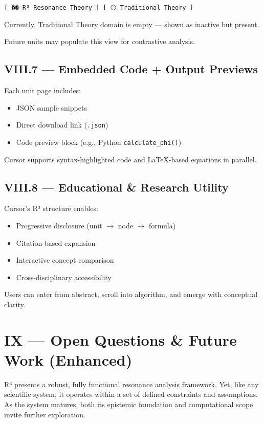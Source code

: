 \begin{verbatim}
[ �� R³ Resonance Theory ] [ ⚪ Traditional Theory ]
\end{verbatim}

Currently, Traditional Theory domain is empty — shown as inactive but present.

Future units may populate this view for contrastive analysis.

\subsection*{VIII.7 — Embedded Code + Output Previews}

Each unit page includes:

\begin{itemize}
    \item JSON sample snippets
    \item Direct download link (\texttt{.json})
    \item Code preview block (e.g., Python \texttt{calculate\_phi()})
\end{itemize}

Cursor supports syntax-highlighted code and LaTeX-based equations in parallel.

\subsection*{VIII.8 — Educational \& Research Utility}

Cursor’s R³ structure enables:

\begin{itemize}
    \item Progressive disclosure (unit $\rightarrow$ node $\rightarrow$ formula)
    \item Citation-based expansion
    \item Interactive concept comparison
    \item Cross-disciplinary accessibility
\end{itemize}

Users can enter from abstract, scroll into algorithm, and emerge with conceptual clarity.

\section*{IX — Open Questions \& Future Work (Enhanced)}

R³ presents a robust, fully functional resonance analysis framework. Yet, like any scientific system, it operates within a set of defined constraints and assumptions. As the system matures, both its epistemic foundation and computational scope invite further exploration.

